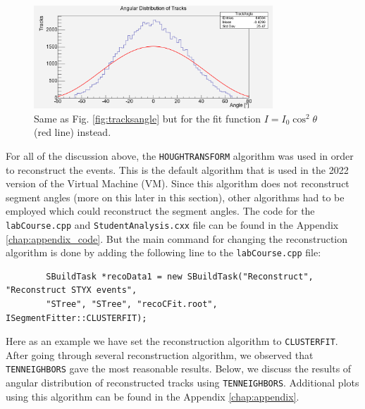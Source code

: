\documentclass[a4paper]{report}
\numberwithin{equation}{section}
\begin{document}
\begin{figure}[!h]
	\centering
	\includegraphics[width=0.8\textwidth]{trackangle_cos2fit.png}
	\caption{Same as Fig. \ref{fig:tracksangle} but for the fit function $I = I_0 \cos^2 \theta$ (red line) instead. }
	\label{fig:tracksangle_cos2fit}
\end{figure} \par

For all of the discussion above, the \texttt{HOUGHTRANSFORM} algorithm was used in order to reconstruct the events. This is the default algorithm that is used in the 2022 version of the Virtual Machine (VM). Since this algorithm does not reconstruct segment angles (more on this later in this section), other algorithms had to be employed which could reconstruct the segment angles. The code for the \texttt{labCourse.cpp} and \texttt{StudentAnalysis.cxx} file can be found in the Appendix \ref{chap:appendix_code}. But the main command for changing the reconstruction algorithm is done by adding the following line to the \texttt{labCourse.cpp} file:

\begin{tcolorbox}
	\begin{verbatim}
		SBuildTask *recoData1 = new SBuildTask("Reconstruct", "Reconstruct STYX events",
        "STree", "STree", "recoCFit.root", ISegmentFitter::CLUSTERFIT);
	\end{verbatim}
\end{tcolorbox}

\noindent Here as an example we have set the reconstruction algorithm to \texttt{CLUSTERFIT}. After going through several reconstruction algorithm, we observed that \texttt{TENNEIGHBORS} gave the most reasonable results. Below, we discuss the results of angular distribution of reconstructed tracks using \texttt{TENNEIGHBORS}. Additional plots using this algorithm can be found in the Appendix \ref{chap:appendix}.
\end{document}
